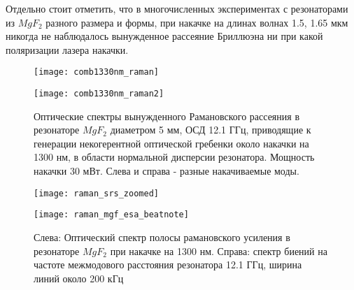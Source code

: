 Отдельно стоит отметить, что в многочисленных экспериментах с резонаторами из $MgF_2$ разного размера и формы, при накачке на длинах волнах 1.5, 1.65 мкм никогда не наблюдалось вынужденное рассеяние Бриллюэна ни при какой поляризации лазера накачки.

\begin{figure}[ht]
\begin{minipage}[ht]{0.49\linewidth}\centering
    \texttt{[image: comb1330nm\_raman]}
  \end{minipage}
  \hfill
  \begin{minipage}[ht]{0.49\linewidth}\centering
    \texttt{[image: comb1330nm\_raman2]}
  \end{minipage}
    \caption{Оптические спектры вынужденного Рамановского рассеяния в резонаторе $MgF_2$ диаметром 5 мм, ОСД 12.1 ГГц, приводящие к генерации некогерентной оптической гребенки около накачки на 1300 нм, в области нормальной дисперсии резонатора. Мощность накачки 30 мВт. Слева и справа - разные накачиваемые моды.}
  \label{mgf_srs}
\end{figure}

\begin{figure}[ht]
\begin{minipage}[ht]{0.49\linewidth}\centering
    \texttt{[image: raman\_srs\_zoomed]}
  \end{minipage}
  \hfill
  \begin{minipage}[ht]{0.49\linewidth}\centering
    \texttt{[image: raman\_mgf\_esa\_beatnote]}
  \end{minipage}
    \caption{Слева: Оптический спектр полосы рамановского усиления в резонаторе $MgF_2$ при накачке на 1300 нм. Справа: спектр биений на частоте межмодового расстояния резонатора 12.1 ГГц, ширина линий около 200 кГц}
  \label{mgf_srs_beatnote}
\end{figure}


